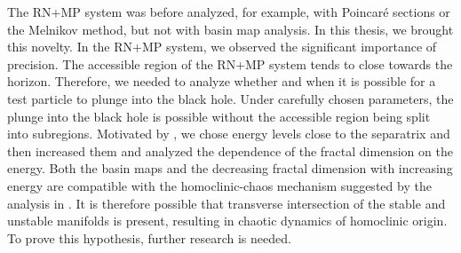 The RN+MP system was before analyzed, for example, with Poincaré sections or the Melnikov method, but not with basin map analysis. In this thesis, we brought this novelty.
In the RN+MP system, we observed the significant importance of precision. The accessible region of the RN+MP system tends to close towards the horizon. Therefore, we needed to analyze whether and when it is possible for a test particle to plunge into the black hole. Under carefully chosen parameters, the plunge into the black hole is possible without the accessible region being split into subregions. Motivated by \cite{PolcarSemerak2019}, we chose energy levels close to the separatrix and then increased them and analyzed the dependence of the fractal dimension on the energy. Both the basin maps and the decreasing fractal dimension with increasing energy are compatible with the homoclinic-chaos mechanism suggested by the analysis in \cite{PolcarSemerak2019}. It is therefore possible that transverse intersection of the stable and unstable manifolds is present, resulting in chaotic dynamics of homoclinic origin. To prove this hypothesis, further research is needed.
